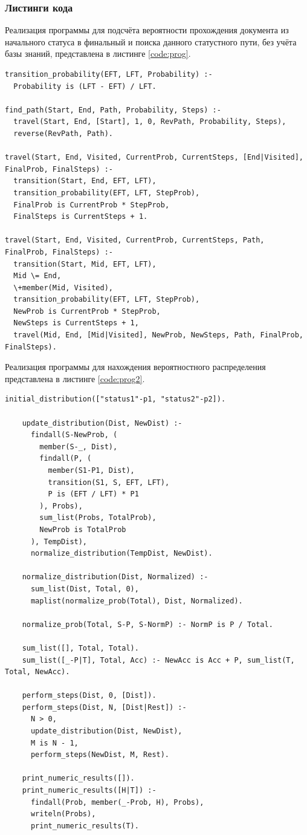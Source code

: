 \subsubsection{Листинги кода}

Реализация программы для подсчёта вероятности прохождения документа из начального статуса в финальный и поиска данного статустного пути, без учёта базы знаний, представлена в листинге \ref{code:prog}.

\begin{lstlisting}[label=code:prog, caption={Реализация поиска пути и вероятности}]
transition_probability(EFT, LFT, Probability) :-
  Probability is (LFT - EFT) / LFT.

find_path(Start, End, Path, Probability, Steps) :-
  travel(Start, End, [Start], 1, 0, RevPath, Probability, Steps),
  reverse(RevPath, Path).

travel(Start, End, Visited, CurrentProb, CurrentSteps, [End|Visited], FinalProb, FinalSteps) :-
  transition(Start, End, EFT, LFT),
  transition_probability(EFT, LFT, StepProb),
  FinalProb is CurrentProb * StepProb,
  FinalSteps is CurrentSteps + 1.

travel(Start, End, Visited, CurrentProb, CurrentSteps, Path, FinalProb, FinalSteps) :-
  transition(Start, Mid, EFT, LFT),
  Mid \= End,
  \+member(Mid, Visited),
  transition_probability(EFT, LFT, StepProb),
  NewProb is CurrentProb * StepProb,
  NewSteps is CurrentSteps + 1,
  travel(Mid, End, [Mid|Visited], NewProb, NewSteps, Path, FinalProb, FinalSteps).
\end{lstlisting}

Реализация программы для нахождения вероятностного распределения представлена в листинге \ref{code:prog2}.

\clearpage

\begin{lstlisting}[label=code:prog2, caption={Реализация построения вероятностного распределения}]
	initial_distribution(["status1"-p1, "status2"-p2]).
	
	update_distribution(Dist, NewDist) :-
	  findall(S-NewProb, (
	    member(S-_, Dist),
	    findall(P, (
	      member(S1-P1, Dist),
	      transition(S1, S, EFT, LFT),
	      P is (EFT / LFT) * P1
	    ), Probs),
	    sum_list(Probs, TotalProb),
	    NewProb is TotalProb
	  ), TempDist),
	  normalize_distribution(TempDist, NewDist).
	
	normalize_distribution(Dist, Normalized) :-
	  sum_list(Dist, Total, 0),
	  maplist(normalize_prob(Total), Dist, Normalized).
	
	normalize_prob(Total, S-P, S-NormP) :- NormP is P / Total.
	
	sum_list([], Total, Total).
	sum_list([_-P|T], Total, Acc) :- NewAcc is Acc + P, sum_list(T, Total, NewAcc).
	
	perform_steps(Dist, 0, [Dist]).
	perform_steps(Dist, N, [Dist|Rest]) :-
	  N > 0,
	  update_distribution(Dist, NewDist),
	  M is N - 1,
	  perform_steps(NewDist, M, Rest).
	
	print_numeric_results([]).
	print_numeric_results([H|T]) :-
	  findall(Prob, member(_-Prob, H), Probs),
	  writeln(Probs),
	  print_numeric_results(T).

\end{lstlisting}

\pagebreak
